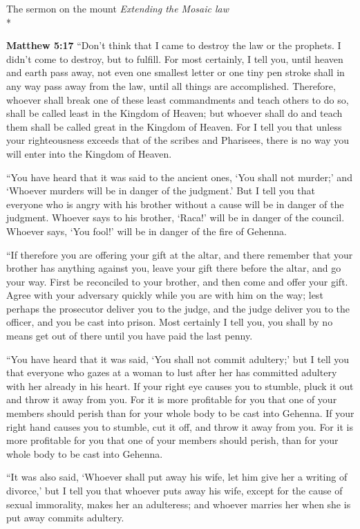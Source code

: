 \documentclass[10pt,twoside]{article} %
\newcommand{\quotesize}{\normalsize{}}
\newenvironment{quotetext}{\begingroup\quotesize}{\endgroup}
\newcommand{\intex}[1]{\index[texts]{#1}}
\newcommand{\bible}[2]{\begin{quotetext}\textbf{#1}\intex{#1} #2\end{quotetext}}
\newcommand{\matthew}[2]{\bible{Matthew #1}{#2}}
\newcommand{\subhead}[1]{\emph{#1}\\*}
\begin{document}
\begin{section}{The sermon on the mount}
\subhead{Extending the Mosaic law}

\matthew{5:17}{
``Don't think that I came to destroy the law or the prophets. I didn't come to destroy, but to fulfill.    For most certainly, I tell you, until heaven and earth pass away, not even one smallest letter or one tiny pen stroke shall in any way pass away from the law, until all things are accomplished.    Therefore, whoever shall break one of these least commandments and teach others to do so, shall be called least in the Kingdom of Heaven; but whoever shall do and teach them shall be called great in the Kingdom of Heaven.    For I tell you that unless your righteousness exceeds that of the scribes and Pharisees, there is no way you will enter into the Kingdom of Heaven.

   ``You have heard that it was said to the ancient ones, `You shall not murder;' and `Whoever murders will be in danger of the judgment.'    But I tell you that everyone who is angry with his brother without a cause  will be in danger of the judgment. Whoever says to his brother, `Raca!' will be in danger of the council. Whoever says, `You fool!' will be in danger of the fire of Gehenna.

   ``If therefore you are offering your gift at the altar, and there remember that your brother has anything against you,    leave your gift there before the altar, and go your way. First be reconciled to your brother, and then come and offer your gift.    Agree with your adversary quickly while you are with him on the way; lest perhaps the prosecutor deliver you to the judge, and the judge deliver you to the officer, and you be cast into prison.    Most certainly I tell you, you shall by no means get out of there until you have paid the last penny.

   ``You have heard that it was said,  `You shall not commit adultery;'    but I tell you that everyone who gazes at a woman to lust after her has committed adultery with her already in his heart.    If your right eye causes you to stumble, pluck it out and throw it away from you. For it is more profitable for you that one of your members should perish than for your whole body to be cast into Gehenna.    If your right hand causes you to stumble, cut it off, and throw it away from you. For it is more profitable for you that one of your members should perish, than for your whole body to be cast into Gehenna.

   ``It was also said, `Whoever shall put away his wife, let him give her a writing of divorce,'    but I tell you that whoever puts away his wife, except for the cause of sexual immorality, makes her an adulteress; and whoever marries her when she is put away commits adultery.

}
\end{section}
\end{document}
